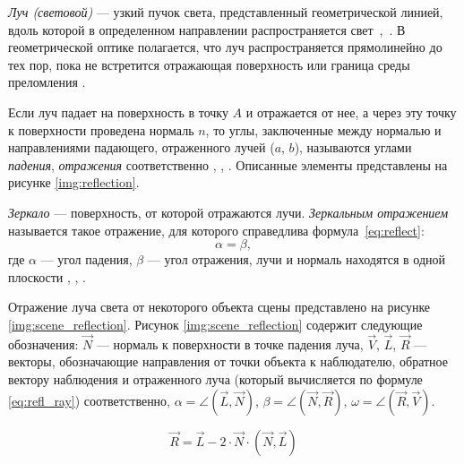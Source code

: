 \textit{Луч (световой)} --- узкий пучок света, представленный геометрической линией, вдоль которой в определенном направлении распространяется свет~\cite{тюрин2005физика},~\cite{оптика20036}. 
В геометрической оптике полагается, что луч распространяется прямолинейно до тех пор, пока не встретится отражающая поверхность или граница среды преломления \cite{порев2002компьютерная}.

Если луч падает на поверхность в точку $A$ и отражается от нее, а через эту точку к поверхности проведена нормаль $n$, то углы, заключенные между нормалью и направлениями падающего, отраженного лучей ($a$, $b$), называются углами \textit{падения}, \textit{отражения} соответственно \cite{тюрин2005физика}, \cite{оптика20036}, \cite{rodionov}.
Описанные элементы представлены на рисунке \ref{img:reflection}.


\textit{Зеркало} --- поверхность, от которой отражаются лучи.
\textit{Зеркальным отражением} называется такое отражение, для которого справедлива формула~\ref{eq:reflect}:
\begin{equation}\label{eq:reflect}
	\alpha=\beta,
\end{equation}
где $\alpha$ --- угол падения, $\beta$ --- угол отражения, лучи и нормаль находятся в одной плоскости \cite{порев2002компьютерная}, \cite{оптика20036}, \cite{rodionov}.

Отражение луча света от некоторого объекта сцены представлено на рисунке \ref{img:scene_reflection}.
Рисунок \ref{img:scene_reflection} содержит следующие обозначения: $\overrightarrow N$ --- нормаль к поверхности в точке падения луча, $\overrightarrow V$, $\overrightarrow L$, $\overrightarrow R$ --- векторы, обозначающие направления от точки объекта к наблюдателю, обратное вектору наблюдения и отраженного луча (который вычисляется по формуле \ref{eq:refl_ray}) соответственно, $\alpha = \angle (\overrightarrow{L}, \overrightarrow{N})$, $\beta = \angle (\overrightarrow{N}, \overrightarrow{R})$, $\omega = \angle (\overrightarrow{R}, \overrightarrow{V})$.


\begin{equation}\label{eq:refl_ray}
	\overrightarrow{R} = \overrightarrow{L} - 2 \cdot \overrightarrow{N} \cdot (\overrightarrow{N}, \overrightarrow{L})
\end{equation}

